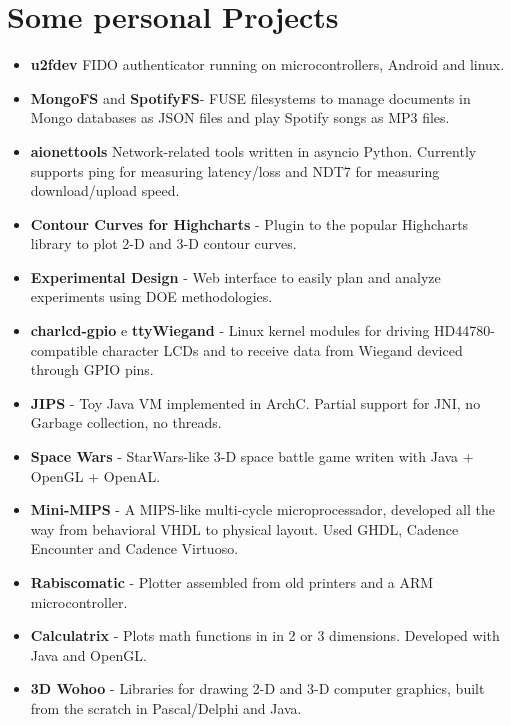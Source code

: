\documentclass[a4paper,10pt]{article}
\begin{document}
  \section{Some personal Projects}
    \begin{itemize}

      \item
        \textbf{u2fdev} FIDO authenticator running on microcontrollers, Android and linux.

      \item
        \textbf{MongoFS} and \textbf{SpotifyFS}- FUSE filesystems to manage documents in Mongo databases as JSON files and play Spotify songs as MP3 files.

      \item
        \textbf{aionettools} Network-related tools written in asyncio Python. Currently supports ping for measuring latency/loss and NDT7 for measuring download/upload speed.

      \item
        \textbf{Contour Curves for Highcharts} - Plugin to the popular Highcharts library to plot 2-D and 3-D contour curves.

      \item
        \textbf{Experimental Design} - Web interface to easily plan and analyze experiments using DOE methodologies.

      \item
        \textbf{charlcd-gpio} e \textbf{ttyWiegand} - Linux kernel modules for driving HD44780-compatible character LCDs and to receive data from Wiegand deviced through GPIO pins.

      \item
        \textbf{JIPS} - Toy Java VM implemented in ArchC. Partial support for JNI, no Garbage collection, no threads.

      \item
        \textbf{Space Wars} - StarWars-like 3-D space battle game writen with Java + OpenGL + OpenAL.

      \item
        \textbf{Mini-MIPS} - A MIPS-like multi-cycle microprocessador, developed all the way from behavioral VHDL to physical layout. Used GHDL, Cadence Encounter and Cadence Virtuoso.

      \item
        \textbf{Rabiscomatic} - Plotter assembled from old printers and a ARM microcontroller.

      \item
        \textbf{Calculatrix} - Plots math functions in in 2 or 3 dimensions. Developed with Java and OpenGL.

      \item
        \textbf{3D Wohoo} - Libraries for drawing 2-D and 3-D computer graphics, built from the scratch in Pascal/Delphi and Java.
    \end{itemize}
\end{document}
